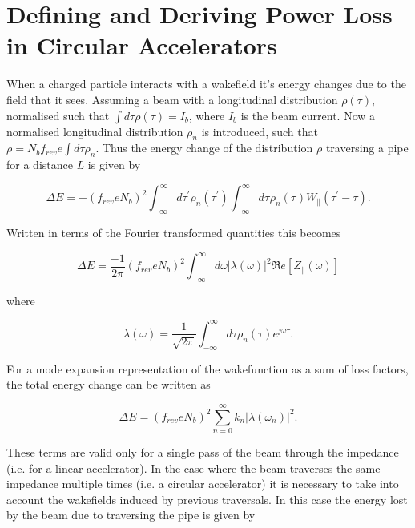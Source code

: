 \documentclass{cernyrep}
\begin{document}
\section{Defining and Deriving Power Loss in Circular Accelerators}
\label{sec:power_loss}

When a charged particle interacts with a wakefield it's energy changes due to the field that it sees. Assuming a beam with a longitudinal distribution $\rho (\tau)$, normalised such that $\int d \tau \rho (\tau ) = I_{b}$, where $I_{b}$ is the beam current. Now a normalised longitudinal distribution $\rho_{n}$ is introduced, such that $\rho = N_{b} f_{rev} e \int d \tau \rho_{n}$. Thus the energy change of the distribution $\rho$ traversing a pipe for a distance $L$ is given by \cite{Chao:PhysColEff, Ng:IntDepInstab}

\begin{equation}
\Delta E = - \left( f_{rev} e N_{b}\right)^{2} \int^{\infty}_{-\infty} d\tau^{'} \rho_{n} \left( \tau^{'} \right) \int^{\infty}_{-\infty} d\tau^{} \rho_{n} \left( \tau^{} \right) W_{\parallel} \left( \tau^{'} - \tau \right).  
\end{equation}

Written in terms of the Fourier transformed quantities this becomes

\begin{equation}
\Delta E = \frac{-1}{2\pi}\left( f_{rev} e N_{b}\right)^{2} \int^{\infty}_{-\infty} d\omega \left| \lambda \left( \omega \right)  \right|^{2} \Re{}e \left[ Z_{\parallel} \left( \omega \right) \right]
\end{equation}

where 

\begin{equation}
\lambda \left( \omega \right) = \frac{1}{\sqrt{2 \pi}}\int^{\infty}_{-\infty} d \tau \rho_{n} \left( \tau \right) e^{j\omega \tau}. 
\end{equation}

For a mode expansion representation of the wakefunction as a sum of loss factors, the total energy change can be written as 

\begin{equation}
\Delta E = \left( f_{rev} e N_{b}\right)^{2} \displaystyle\sum\limits_{n = 0}^{\infty} k_{n} \left| \lambda \left( \omega_{n} \right)  \right|^{2}.
\end{equation}

These terms are valid only for a single pass of the beam through the impedance (i.e. for a linear accelerator). In the case where the beam traverses the same impedance multiple times (i.e. a circular accelerator) it is necessary to take into account the wakefields induced by previous traversals. In this case the energy lost by the beam due to traversing the pipe is given by
\end{document}

